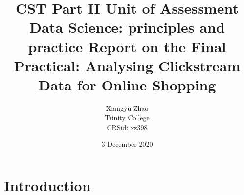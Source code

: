 \documentclass[12pt,twoside,a4paper]{article}
\begin{document}
\setcounter{page}{1}

\title{\vspace{-1cm}
    {\Large CST Part II Unit of Assessment\\Data Science: principles and practice}\bigbreak
    {\bf Report on the Final Practical: Analysing Clickstream Data for Online Shopping}}
\author{Xiangyu Zhao\\Trinity College\\CRSid: xz398}
\date{3 December 2020} 

\maketitle


\section{Introduction}
\end{document}
